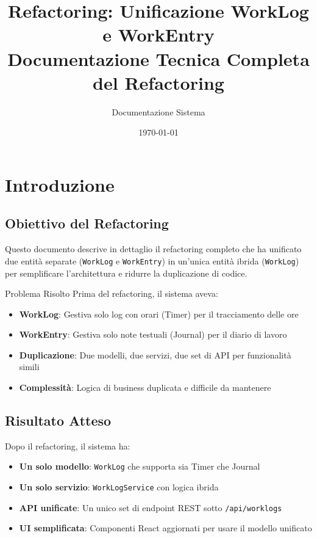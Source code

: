 \documentclass[11pt,a4paper]{article}
\title{\textbf{Refactoring: Unificazione WorkLog e WorkEntry}\\
\large Documentazione Tecnica Completa del Refactoring}
\author{Documentazione Sistema}
\date{\today}
\begin{document}
\maketitle
\tableofcontents
\newpage

\section{Introduzione}

\subsection{Obiettivo del Refactoring}

Questo documento descrive in dettaglio il refactoring completo che ha unificato due entità separate (\texttt{WorkLog} e \texttt{WorkEntry}) in un'unica entità ibrida (\texttt{WorkLog}) per semplificare l'architettura e ridurre la duplicazione di codice.

\begin{importantbox}{Problema Risolto}
Prima del refactoring, il sistema aveva:
\begin{itemize}
    \item \textbf{WorkLog}: Gestiva solo log con orari (Timer) per il tracciamento delle ore
    \item \textbf{WorkEntry}: Gestiva solo note testuali (Journal) per il diario di lavoro
    \item \textbf{Duplicazione}: Due modelli, due servizi, due set di API per funzionalità simili
    \item \textbf{Complessità}: Logica di business duplicata e difficile da mantenere
\end{itemize}
\end{importantbox}

\subsection{Risultato Atteso}

Dopo il refactoring, il sistema ha:
\begin{itemize}
    \item \textbf{Un solo modello}: \texttt{WorkLog} che supporta sia Timer che Journal
    \item \textbf{Un solo servizio}: \texttt{WorkLogService} con logica ibrida
    \item \textbf{API unificate}: Un unico set di endpoint REST sotto \texttt{/api/worklogs}
    \item \textbf{UI semplificata}: Componenti React aggiornati per usare il modello unificato
\end{itemize}
\end{document}
